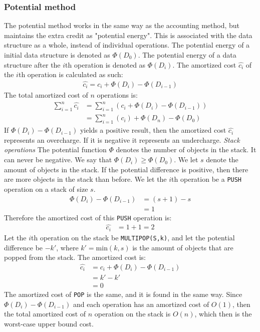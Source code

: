 \subsubsection*{Potential method}
The potential method works in the same way as the accounting method, but
maintains the extra credit as "potential energy". This is associated with the
data structure as a whole, instead of individual operations. The potential
energy of a initial data structure is denoted as $\Phi(D_0)$. The potential
energy of a data structure after the $i$th operation is denoted as $\Phi(D_i)$.
The amortized cost $\hat{c_i}$ of the $i$th operation is calculated as such:
\begin{align*}
  \hat{c_i}=c_i+\Phi(D_i)-\Phi(D_{i-1})
\end{align*}
The total amortized cost of $n$ operations is:
\begin{align*}
  \sum^n_{i=1}\hat{c_i}&=\sum^n_{i=1}(c_i+\Phi(D_i)-\Phi(D_{i-1}))\\
  &=\sum^n_{i=1}(c_i)+\Phi(D_n)-\Phi(D_{0})
\end{align*}
If $\Phi(D_i)-\Phi(D_{i-1})$ yields a positive result, then the amortized cost
$\hat{c_i}$ represents an overcharge. If it is negative it represents an
undercharge.
\newline\newline\textit{Stack operations}\newline
The potential function $\Phi$ denotes the number of objects in the stack. It
can never be negative. \newline\newline
We say that $\Phi(D_i)\geq\Phi(D_0)$. We let $s$ denote the amount of objects
in the stack. If the potential difference is positive, then there are more
objects in the stack than before. \newline\newline
We let the $i$th operation be a \texttt{PUSH} operation on a stack of size $s$.
\begin{align*}
  \Phi(D_i)-\Phi(D_{i-1})&=(s+1)-s\\
  &=1
\end{align*}
Therefore the amortized cost of this \texttt{PUSH} operation is:
\begin{align*}
  \hat{c_i}&=1+1=2
\end{align*}
Let the $i$th operation on the stack be \texttt{MULTIPOP(S,k)}, and let the
potential difference be $-k'$, where $k'=\textrm{min}(k,s)$ is the amount of
objects that are popped from the stack. The amortized cost is:
\begin{align*}
  \hat{c_i}&=c_i+\Phi(D_i)-\Phi(D_{i-1})\\
  &=k'-k'\\
  &=0
\end{align*}
The amortized cost of \texttt{POP} is the same, and it is found in the same way.
\newline\newline
Since $\Phi(D_i)-\Phi(D_{i-1})$ and each operation has an amortized cost of
$O(1)$, then the total amortized cost of $n$ operation on the stack is $O(n)$,
which then is the worst-case upper bound cost.

